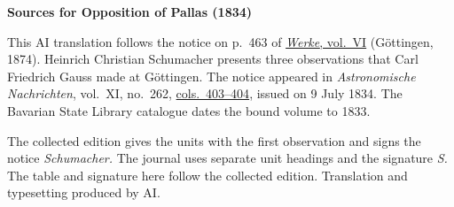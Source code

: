 \clearpage\thispagestyle{empty}
\begin{center}\textbf{Sources for Opposition of Pallas (1834)}\end{center}
\noindent This AI translation follows the notice on p.~463 of \href{https://gdz.sub.uni-goettingen.de/id/PPN236007467}{\textit{Werke}, vol.~VI} (Göttingen, 1874). Heinrich Christian Schumacher presents three observations that Carl Friedrich Gauss made at Göttingen. The notice appeared in \textit{Astronomische Nachrichten}, vol.~XI, no.~262, \href{https://api.digitale-sammlungen.de/iiif/image/v2/bsb10049436_00218/full/1800,/0/default.jpg}{cols.~403--404}, issued on 9 July 1834. The Bavarian State Library catalogue dates the bound volume to 1833.
\par\smallskip\noindent The collected edition gives the units with the first observation and signs the notice \textit{Schumacher.} The journal uses separate unit headings and the signature \textit{S.} The table and signature here follow the collected edition. Translation and typesetting produced by AI.
\clearpage
